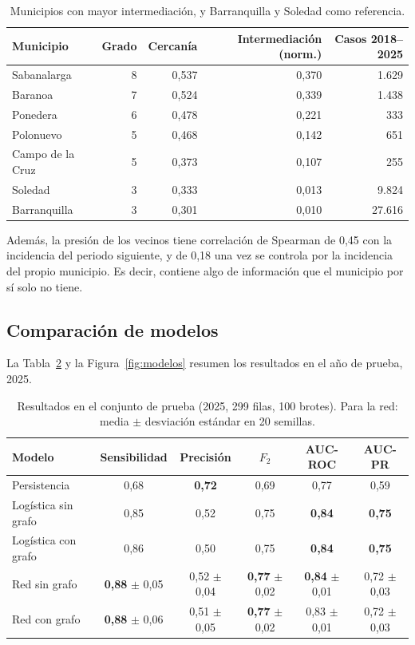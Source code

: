 \documentclass[11pt,letterpaper]{article}
\begin{document}
\begin{table}[H]
\centering\small
\caption{Municipios con mayor intermediación, y Barranquilla y Soledad como referencia.}
\label{tab:centralidad}
\begin{tabular}{@{}lrrrr@{}}
\toprule
Municipio & Grado & Cercanía & Intermediación (norm.) & Casos 2018--2025 \\
\midrule
Sabanalarga & 8 & 0,537 & 0,370 & 1.629 \\
Baranoa & 7 & 0,524 & 0,339 & 1.438 \\
Ponedera & 6 & 0,478 & 0,221 & 333 \\
Polonuevo & 5 & 0,468 & 0,142 & 651 \\
Campo de la Cruz & 5 & 0,373 & 0,107 & 255 \\
\midrule
Soledad & 3 & 0,333 & 0,013 & 9.824 \\
Barranquilla & 3 & 0,301 & 0,010 & 27.616 \\
\bottomrule
\end{tabular}
\end{table}

\noindent Además, la presión de los vecinos tiene correlación de Spearman de 0,45 con la incidencia del periodo siguiente, y de 0,18 una vez se controla por la incidencia del propio municipio. Es decir, contiene algo de información que el municipio por sí solo no tiene.

\subsection{Comparación de modelos}
La Tabla~\ref{tab:modelos} y la Figura~\ref{fig:modelos} resumen los resultados en el año de prueba, 2025.

\begin{table}[H]
\centering\small
\caption{Resultados en el conjunto de prueba (2025, 299 filas, 100 brotes). Para la red: media $\pm$ desviación estándar en 20 semillas.}
\label{tab:modelos}
\begin{tabular}{@{}lccccc@{}}
\toprule
Modelo & Sensibilidad & Precisión & $F_2$ & AUC-ROC & AUC-PR \\
\midrule
Persistencia & 0,68 & \textbf{0,72} & 0,69 & 0,77 & 0,59 \\
Logística sin grafo & 0,85 & 0,52 & 0,75 & \textbf{0,84} & \textbf{0,75} \\
Logística con grafo & 0,86 & 0,50 & 0,75 & \textbf{0,84} & \textbf{0,75} \\
Red sin grafo & \textbf{0,88} $\pm$ 0,05 & 0,52 $\pm$ 0,04 & \textbf{0,77} $\pm$ 0,02 & \textbf{0,84} $\pm$ 0,01 & 0,72 $\pm$ 0,03 \\
Red con grafo & \textbf{0,88} $\pm$ 0,06 & 0,51 $\pm$ 0,05 & \textbf{0,77} $\pm$ 0,02 & 0,83 $\pm$ 0,01 & 0,72 $\pm$ 0,03 \\
\bottomrule
\end{tabular}
\end{table}
\end{document}
